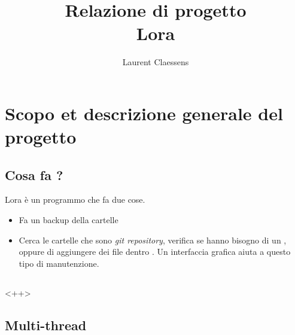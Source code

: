 \documentclass[a4paper,12pt]{article}
\begin{document}
\title{Relazione di progetto\\Lora}
\author{Laurent Claessens}
\maketitle

\tableofcontents

\section{Scopo et descrizione generale del progetto}

\subsection{Cosa fa ?}

Lora è un programmo che fa due cose.
\begin{itemize}
    \item
        Fa un backup della cartelle 
    \item
        Cerca le cartelle che sono \emph{git repository}, verifica se hanno bisogno di un ,  oppure di aggiungere dei file dentro . Un interfaccia grafica aiuta a questo tipo di manutenzione.
\end{itemize}

\subsection{}

<++>

\subsection{Multi-thread}
\end{document}
